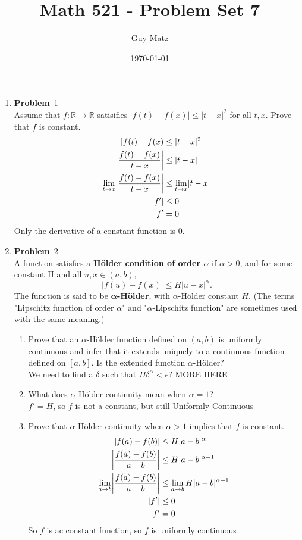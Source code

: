 \documentclass[12pt]{amsart}
\title{\textbf{Math 521 - Problem Set 7}}
\author{Guy Matz}
\date{\today}
\newcommand{\benu}{\begin{enumerate}}
\newcommand{\eenu}{\end{enumerate}}
\theoremstyle{definition}
\newcommand{\mbR}{\mathbb{R}}
\newcommand{\ep}{\epsilon}
\newcommand{\itep}{\item {\bfseries Problem}\ }
\DeclarePairedDelimiter\abs{\lvert}{\rvert}
\begin{document}
 

\maketitle

\begin{enumerate}[series=p]
\itep 1\\
Assume that $f : \mbR \to \mbR$ satisifies $|f(t) - f(x)| \leq |t - x|^2$ for all $t, x$.  Prove that $f$ is constant.
\\
\begin{align*}
|f(t) - f(x) &\leq |t -x |^2
\\
\abs*{\frac{f(t) - f(x)}{t - x}} &\leq |t-x|
\\
\lim\limits_{t \to x} \abs*{\frac{f(t) - f(x)}{t - x}} &\leq \lim\limits_{t \to x} \abs{t -x}
\\
\abs{f'} &\leq 0
\\
f' &= 0
\end{align*}
Only the derivative of a constant function is 0.
\newpage

\itep 2\\
A function satisfies a \textbf{H\"{o}lder condition of order $\alpha$} if $\alpha > 0$, and for some constant H and all $u, x \in (a,b)$,
$$|f(u) - f(x)| \leq H|u - x|^{\alpha}.$$
The function is said to be $\mathbf{\alpha}$\textbf{-H\"{o}lder}, with $\alpha$-H\"{o}lder constant $H$.  (The terms "Lipschitz function of order $\alpha$" and "$\alpha$-Lipschitz function" are sometimes used with the same meaning.)
	\benu
		\item Prove that an $\alpha$-H\"{o}lder function defined on $(a,b)$ is uniformly continuous and infer that it extends uniquely to a continuous function defined on $[a,b]$.  Is the extended function $\alpha$-H\"{o}lder?\\
		
		We need to find a $\delta$ such that $H\delta^\alpha < \ep$?  MORE HERE
		\\
		\item What does $\alpha$-H\"{o}lder continuity mean when $\alpha = 1$?\\
		
		$f' = H$, so $f$ is not a constant, but still Uniformly Continuous
		\item Prove that $\alpha$-H\"{o}lder continuity when $\alpha> 1$ implies that $f$ is constant.
		\\
		\begin{align*}
		\abs{f(a) - f(b)} &\leq H|a -b |^\alpha
		\\
		\abs*{\frac{f(a) - f(b)}{a - b}} &\leq H|a -b |^{\alpha-1}
		\\
		\lim\limits_{a \to b} \abs*{\frac{f(a) - f(b)}{a - b}} &\leq \lim\limits_{a \to b} H\abs{a - b}^{\alpha - 1}
		\\
		\abs{f'} &\leq 0
		\\
		f' &= 0
		\end{align*}
		So $f$ is ac constant function, so $f$ is uniformly continuous
	\eenu
\newpage


\end{enumerate}
\end{document}
